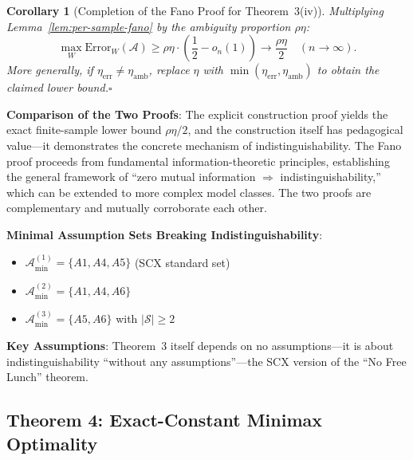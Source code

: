 \documentclass[12pt,a4paper]{article}
\newtheorem{corollary}[theorem]{Corollary}
\theoremstyle{definition}
\theoremstyle{remark}
\begin{document}
\begin{corollary}[Completion of the Fano Proof for Theorem~3(iv)]
Multiplying Lemma~\ref{lem:per-sample-fano} by the ambiguity proportion $\rho\eta$:
\begin{equation}
\max_{W} \mathrm{Error}_W(\mathcal{A}) \geq \rho\eta \cdot \left(\frac{1}{2} - o_n(1)\right) \to \frac{\rho\eta}{2} \quad (n \to \infty).
\end{equation}
More generally, if $\eta_{\text{err}} \neq \eta_{\text{amb}}$, replace $\eta$ with $\min(\eta_{\text{err}}, \eta_{\text{amb}})$ to obtain the claimed lower bound.\hfill$\square$
\end{corollary}

\textbf{Comparison of the Two Proofs}: The explicit construction proof yields the exact finite-sample lower bound $\rho\eta/2$, and the construction itself has pedagogical value---it demonstrates the concrete mechanism of indistinguishability. The Fano proof proceeds from fundamental information-theoretic principles, establishing the general framework of ``zero mutual information $\Rightarrow$ indistinguishability,'' which can be extended to more complex model classes. The two proofs are complementary and mutually corroborate each other.

\textbf{Minimal Assumption Sets Breaking Indistinguishability}:
\begin{itemize}
\item $\mathcal{A}_{\min}^{(1)} = \{A1, A4, A5\}$ (SCX standard set)
\item $\mathcal{A}_{\min}^{(2)} = \{A1, A4, A6\}$
\item $\mathcal{A}_{\min}^{(3)} = \{A5, A6\}$ with $|\mathcal{S}| \geq 2$
\end{itemize}

\textbf{Key Assumptions}: Theorem~3 itself depends on no assumptions---it is about indistinguishability ``without any assumptions''---the SCX version of the ``No Free Lunch'' theorem.

\subsection{Theorem 4: Exact-Constant Minimax Optimality}
\end{document}
